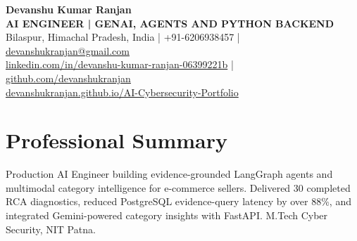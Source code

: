 \documentclass[a4paper,11pt]{article}
\begin{document}
\begin{center}
{\fontsize{17.3}{20}\selectfont\bfseries Devanshu Kumar Ranjan}\\[2pt]
{\small\bfseries AI ENGINEER | GENAI, AGENTS AND PYTHON BACKEND}\\[4pt]
{\footnotesize Bilaspur, Himachal Pradesh, India \quad | \quad +91-6206938457 \quad | \quad \href{mailto:devanshukranjan@gmail.com}{devanshukranjan@gmail.com}}\\[2pt]
{\footnotesize \href{https://linkedin.com/in/devanshu-kumar-ranjan-06399221b}{linkedin.com/in/devanshu-kumar-ranjan-06399221b} \quad | \quad \href{https://github.com/devanshukranjan}{github.com/devanshukranjan}}\\[2pt]
{\footnotesize \href{https://devanshukranjan.github.io/AI-Cybersecurity-Portfolio/}{devanshukranjan.github.io/AI-Cybersecurity-Portfolio}}
\end{center}
\vspace{-6pt}
\section{Professional Summary}
\small Production AI Engineer building evidence-grounded LangGraph agents and multimodal category intelligence for e-commerce sellers. Delivered 30 completed RCA diagnostics, reduced PostgreSQL evidence-query latency by over 88\%, and integrated Gemini-powered category insights with FastAPI. M.Tech Cyber Security, NIT Patna.\normalsize
\end{document}
